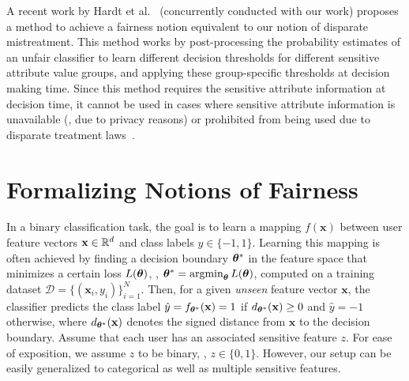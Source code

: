 \documentclass[letterpaper]{sig-alternate-2013}
\newcommand{\disc}{disparate mistreatment}
\begin{document}
A recent work by Hardt et al.~\cite{hardt_nips16} (concurrently conducted with our work) proposes a method
to achieve a fairness notion equivalent to our notion of \disc{}.
 This method
works by post-processing the probability estimates of an unfair classifier to learn
 different decision thresholds for different sensitive attribute value groups, and applying these group-specific thresholds at decision making time.
Since this method requires the sensitive attribute information at decision time,
it cannot be used in cases where sensitive attribute information is unavailable (\eg, due to privacy reasons) or prohibited
from being used due to disparate treatment laws~\cite{barocas_2016}.









\vspace{-3mm}
\section{Formalizing Notions of Fairness} \label{sec:format_setting}
\noindent
In a binary classification task, the goal is to learn a mapping $f(\mathbf{x})$ between user feature vectors $\mathbf{x} \in \mathbb{R}^d$ and class labels $y \in \{-1, 1\}$. Learning this mapping
is often achieved by finding a decision boundary $\boldsymbol{\theta}^*$ in the feature space that mi\-ni\-mizes a certain loss $L(\boldsymbol{\theta})$, \ie, $\boldsymbol{\theta}^{*} = \mathop{\mathrm{argmin}}_{\boldsymbol{\theta}} L(\boldsymbol{\theta})$,
computed on a training dataset $\mathcal{D} = \{ (\mathbf{x}_i, y_i) \}_{i=1}^{N}$.
Then, for a given \emph{unseen} feature vector $\mathbf{x}$,
the classifier predicts the class label
$\hat{y} = f_{\boldsymbol{\theta}^{*}}(\mathbf{x}) = 1$ if $d_{\boldsymbol{\theta}^{*}}(\mathbf{x}) \geq 0$ and
$\hat{y} = -1$
other\-wise, where $d_{\boldsymbol{\theta}^{*}}(\mathbf{x})$ denotes the signed distance from
$\mathbf{x}$ to the decision boundary.
Assume that each user has an associated sensitive feature $z$. For ease of exposition,
we assume $z$ to be binary, \ie, $z \in \{0, 1\}$.  However, our setup can be easily generalized to categorical
as well as multiple sensitive features.
\end{document}
